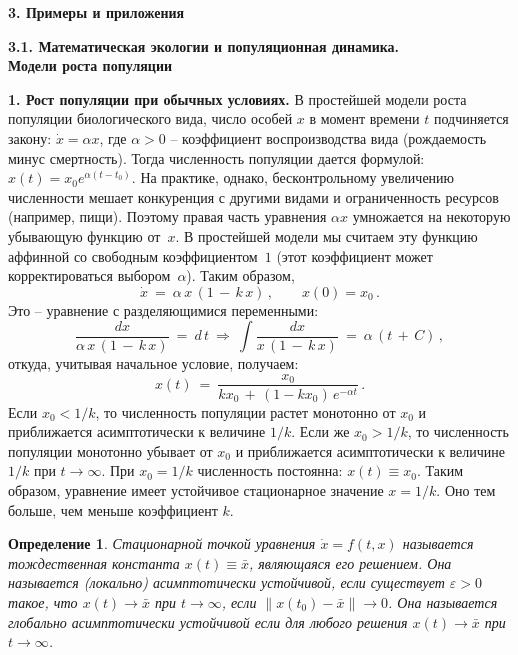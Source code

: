 \documentclass[12pt,a4paper]{article}
\newtheorem{defi}{Определение}
\begin{document}
\newpage

\begin{center}
\large{\textbf{3. Примеры и приложения}}
\end{center}

\bigskip

\medskip
\begin{center}
\textbf{3.1. Математическая экологии и популяционная динамика.\\
Модели роста популяции}
\end{center}
\medskip



\textbf{1. Рост популяции при обычных условиях.} В простейшей модели роста популяции биологического вида, число особей $x$ в момент времени $t$
подчиняется закону: $\dot x  = \alpha x$, где $\alpha > 0$ -- коэффициент воспроизводства вида (рождаемость минус смертность).
Тогда численность популяции дается формулой: $x(t) = x_0 e^{\alpha (t-t_0)}$. На практике, однако, бесконтрольному увеличению численности мешает конкуренция с другими видами и ограниченность ресурсов (например, пищи). Поэтому правая часть уравнения $\alpha x$
умножается на некоторую убывающую функцию от~$x$. В простейшей модели мы считаем эту функцию аффинной со свободным коэффициентом~$1$ (этот коэффициент может корректироваться выбором~$\alpha$). Таким образом,
\begin{equation}\label{eq.popul1}
\dot x \ = \ \alpha \, x\, (1 \, - \, k\, x)\, , \qquad x(0) = x_0\, .
\end{equation}
Это -- уравнение с разделяющимися переменными:
$$
\frac{dx}{\alpha \, x\, (1 \, - \, k\, x)} \ = \ d\, t \ \Rightarrow \ \int \frac{dx}{x\, (1 \, - \, k\, x)} \ = \ \alpha \, (t\, + \, C)\, ,
$$
откуда, учитывая начальное условие, получаем:
\begin{equation}\label{eq.sol-popul1}
x(t)\ = \ \frac{x_0}{kx_0 \, + \, (1-kx_0)\, e^{-\alpha t}}\, .
\end{equation}
Если $x_0 < 1/k$, то численность популяции растет монотонно от $x_0$ и приближается асимптотически к
величине $1/k$. Если же $x_0 > 1/k$, то численность популяции монотонно убывает от $x_0$ и приближается асимптотически к
величине $1/k$ при $t \to \infty$. При $x_0 = 1/k$ численность постоянна: $x(t) \equiv x_0$. Таким образом,
уравнение имеет устойчивое стационарное значение $x = 1/k$. Оно тем больше, чем меньше коэффициент $k$.

\begin{defi}\label{d.stability}
Стационарной точкой уравнения $\dot x = f(t, x)$ называется тождественная константа $x(t)\equiv \bar x$, являющаяся его решением. Она называется (локально) {\em асимптотически устойчивой}, если существует $\varepsilon > 0$ такое, что
$x(t) \to \bar x$ при $t \to \infty$, если $\|x(t_0) - \bar x\| \to 0$. Она называется {\em глобально асимптотически устойчивой}
если для любого решения $x(t) \to \bar x$ при $t \to \infty$.
\end{defi}
\end{document}
